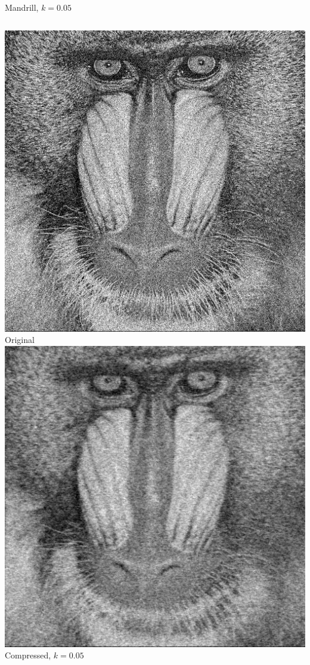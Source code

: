 \documentclass[12pt]{beamer}
\begin{document}
\begin{frame}{Mandrill, \(k=0.05\)}
  \begin{columns}
      \includegraphics[width=\textwidth]{Mandrill.jpg}\\
      \footnotesize Original
      \includegraphics[width=\textwidth]{Mandrill_k05.png}\\
      \footnotesize Compressed, \(k=0.05\)
  \end{columns}
\end{frame}
\end{document}
